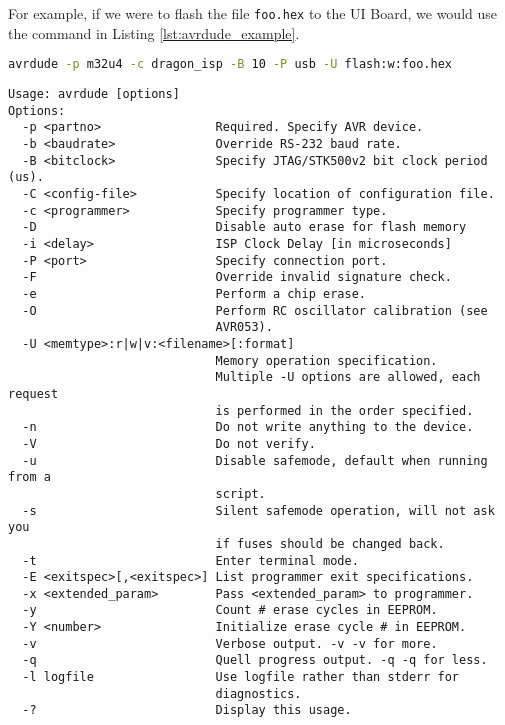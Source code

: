 \documentclass{report}
\begin{document}
				For example, if we were to flash the file \lstinline{foo.hex} to the UI Board, we would use the command in Listing \ref{lst:avrdude_example}.

				\begin{lstlisting}[language=sh, caption={Example avrdude command}, label={lst:avrdude_example}]
avrdude -p m32u4 -c dragon_isp -B 10 -P usb -U flash:w:foo.hex
				\end{lstlisting}

				\begin{lstlisting}[caption={\lstinline{avrdude} usage}, label={lst:avrdude_usage}]
Usage: avrdude [options]
Options:
  -p <partno>                Required. Specify AVR device.
  -b <baudrate>              Override RS-232 baud rate.
  -B <bitclock>              Specify JTAG/STK500v2 bit clock period (us).
  -C <config-file>           Specify location of configuration file.
  -c <programmer>            Specify programmer type.
  -D                         Disable auto erase for flash memory
  -i <delay>                 ISP Clock Delay [in microseconds]
  -P <port>                  Specify connection port.
  -F                         Override invalid signature check.
  -e                         Perform a chip erase.
  -O                         Perform RC oscillator calibration (see 
                             AVR053). 
  -U <memtype>:r|w|v:<filename>[:format]
                             Memory operation specification.
                             Multiple -U options are allowed, each request
                             is performed in the order specified.
  -n                         Do not write anything to the device.
  -V                         Do not verify.
  -u                         Disable safemode, default when running from a
                             script.
  -s                         Silent safemode operation, will not ask you 
                             if fuses should be changed back.
  -t                         Enter terminal mode.
  -E <exitspec>[,<exitspec>] List programmer exit specifications.
  -x <extended_param>        Pass <extended_param> to programmer.
  -y                         Count # erase cycles in EEPROM.
  -Y <number>                Initialize erase cycle # in EEPROM.
  -v                         Verbose output. -v -v for more.
  -q                         Quell progress output. -q -q for less.
  -l logfile                 Use logfile rather than stderr for 
                             diagnostics.
  -?                         Display this usage.
				\end{lstlisting}
\end{document}
